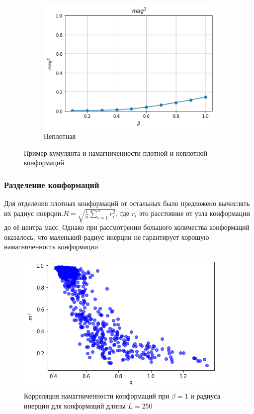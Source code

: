 \begin{figure}[h]
\begin{subfigure}[t]{0.48\textwidth}
		\includegraphics[width=\textwidth]{../images/loose_magnetization.png} 
		\caption{Неплотная}
	\end{subfigure}
	\caption{Пример кумулянта и намагниченности плотной и неплотной конформаций}
\end{figure}


\subsubsection{Разделение конформаций}

Для отделения плотных конформаций от остальных было предложено вычислять их радиус инерции.$R = \sqrt{\frac{1}{n}\sum_{i=1}^{n}r_{i}^{2}}$, где $r_i$ это расстояние от узла конформации до её центра масс. Однако при рассмотрении большого количества конформаций оказалось, что маленький радиус инерции не гарантирует хорошую намагниченность конформации

\begin{figure}[h]
	\centering
	\includegraphics[width=\textwidth]{../images/mag2_to_R_L250.png} 
	\caption{Корреляция намагниченности конформаций при $\beta = 1$ и радиуса инерции для конформаций длины $L = 250$}
	\label{fig:mag2_to_R} 
\end{figure}

